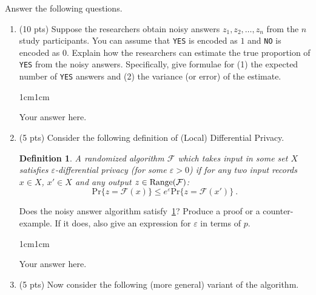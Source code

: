 \documentclass[11pt,letterpaper]{article}
\newenvironment{answer}{\em \color{blue} \begin{adjustwidth}{1cm}{1cm}}{\end{adjustwidth}}
\newcommand{\mc}[1]{\mathcal{#1}}	%
\newcommand{\pr}[1]{\mathrm{Pr}\{#1\}} %
\newtheorem{definition}{\bf Definition}%
\begin{document}

\bigskip
\noindent Answer the following questions.

%
\begin{enumerate}
%
	\item (10 pts) Suppose the researchers obtain noisy answers $z_1, z_2, \ldots, z_n$ from the $n$ study participants. You can assume that \texttt{YES} is encoded as $1$ and \texttt{NO} is encoded as $0$. Explain how the researchers can estimate the true proportion of \texttt{YES} from the noisy answers. Specifically, give formulae for (1) the expected number of \texttt{YES} answers and (2) the variance (or error) of the estimate.
	
	\begin{answer}
	
		Your answer here.
		
	\end{answer}
	
	\item (5 pts) Consider the following definition of (Local) Differential Privacy. 
	\begin{definition}\label{def:localdp}
		A randomized algorithm $\mc{F}$ which takes input in some set $X$ satisfies $\varepsilon$-{\em differential privacy} (for some $\varepsilon > 0$) if for any two input records $x \in X$, $x' \in X$  and any output $z \in {\rm Range}(\mc{F})$:
			\[ \pr{z = \mc{F}(x)} \leq e^\varepsilon \pr{z = \mc{F}(x')} \ . \]
	\end{definition}
	
	Does the noisy answer algorithm satisfy~\cref{def:localdp}? Produce a proof or a counter-example. If it does, also give an expression for $\varepsilon$ in terms of $p$.
	
	\begin{answer}
	
		Your answer here.
		
	\end{answer}
	
	\item (5 pts) Now consider the following (more general) variant of the algorithm.
	

\end{enumerate}
\end{document}
